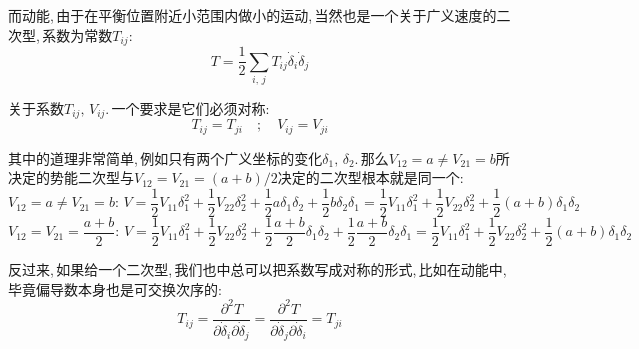 而动能,\,由于在平衡位置附近小范围内做小的运动,\,当然也是一个关于广义速度的二次型,\,系数为常数$T_{ij}$:
\[T=\frac{1}{2}\sum_{i,\,j} T_{ij}\dot{\delta}_i\dot{\delta}_j\]

关于系数$T_{ij},\,V_{ij}$.\,一个要求是它们必须对称:
\[T_{ij}=T_{ji}\quad;\quad V_{ij}=V_{ji}\]

其中的道理非常简单,\,例如只有两个广义坐标的变化$\delta_1,\,\delta_2$.\,那么$V_{12}=a\neq V_{21}=b$所决定的势能二次型与$V_{12}=V_{21}=(a+b)/2$决定的二次型根本就是同一个:
\[V_{12}=a\neq V_{21}=b:\,V=\frac{1}{2}V_{11} \delta_1^2+\frac{1}{2}V_{22} \delta_2^2+\frac{1}{2}a\delta_1\delta_2+\frac{1}{2}b\delta_2\delta_1=\frac{1}{2}V_{11} \delta_1^2+\frac{1}{2}V_{22} \delta_2^2+\frac{1}{2}(a+b)\delta_1\delta_2\]
\[V_{12}=V_{21}=\frac{a+b}{2}:\,V=\frac{1}{2}V_{11} \delta_1^2+\frac{1}{2}V_{22} \delta_2^2+\frac{1}{2}\frac{a+b}{2}\delta_1\delta_2+\frac{1}{2}\frac{a+b}{2}\delta_2\delta_1=\frac{1}{2}V_{11} \delta_1^2+\frac{1}{2}V_{22} \delta_2^2+\frac{1}{2}(a+b)\delta_1\delta_2\]

反过来,\,如果给一个二次型,\,我们也中总可以把系数写成对称的形式,\,比如在动能中,\,毕竟偏导数本身也是可交换次序的:
\[T_{ij}=\frac{\partial^2 T}{\partial \dot{\delta}_i\partial \dot{\delta}_j}=\frac{\partial^2 T}{\partial \dot{\delta}_j\partial \dot{\delta}_i}=T_{ji}\]

